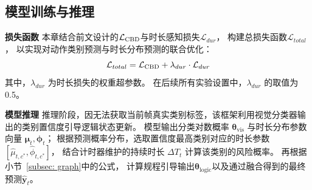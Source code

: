 \subsection{模型训练与推理}

\textbf{损失函数}\quad
本章结合前文设计的\lossfull \(\mathcal{L}_{\text{\lshort}}\)与时长感知损失\(\mathcal{L}_{dur}\)，
构建总损失函数\(\mathcal{L}_{total}\)，
以实现对动作类别预测与时长分布预测的联合优化：
\begin{equation}
    \mathcal{L}_{total} = \mathcal{L}_{\text{\lshort}} 
    + \lambda_{dur} \cdot \mathcal{L}_{dur}
\end{equation}
其中，\(\lambda_{dur}\) 为时长损失的权重超参数。
在后续所有实验设置中，\(\lambda_{dur}\) 的取值为0.5。

\textbf{模型推理}\quad
推理阶段，因无法获取当前帧真实类别标签，该框架利用视觉分类器输出的类别置信度引导逻辑状态更新。
模型输出分类对数概率 \(\mathbf{\theta}_{\mathrm{vis}}\) 
与时长分布参数向量 \(\boldsymbol{\mu}_t, \boldsymbol{\phi}_t\)；
根据预测概率分布，选取置信度最高类别对应的时长参数 \([\hat{\mu}_{t, c^*}, \hat{\phi}_{t, c^*}]\)，
结合计时器维护的持续时长 \(\Delta T_t\) 计算该类别的风险概率。
再根据小节~\ref{subsec: graph}中的公式，
计算规程引导输出\(\mathbf{\theta}_\mathrm{logic}\)以及通过融合得到的最终预测\(\hat{\mathbf{y}}_t\)。

\FloatBarrier

